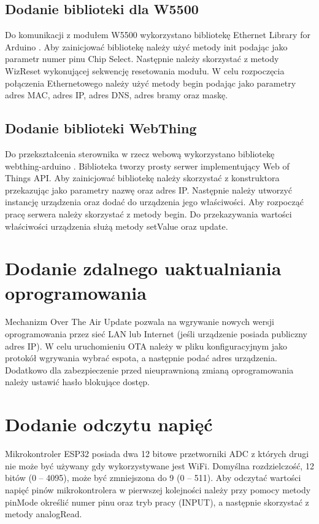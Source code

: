 \documentclass[11pt]{report}
\begin{document}
 \subsection{Dodanie biblioteki dla W5500}
 Do komunikacji z modułem W5500 wykorzystano bibliotekę Ethernet Library for Arduino \cite{ethernetlibrary}. Aby zainicjować bibliotekę należy użyć metody init podając jako parametr numer pinu Chip Select. Następnie należy skorzystać z metody WizReset wykonującej sekwencję resetowania modułu. W celu rozpoczęcia połączenia Ethernetowego należy użyć metody begin podając jako parametry adres MAC, adres IP, adres DNS, adres bramy oraz maskę.
 \subsection{Dodanie biblioteki WebThing}
 Do przekształcenia sterownika w rzecz webową wykorzystano bibliotekę webthing-arduino \cite{webthinglibrary}. Biblioteka tworzy prosty serwer implementujący Web of Things API.
 Aby zainicjować bibliotekę należy skorzystać z konstruktora przekazując jako parametry nazwę oraz adres IP. Następnie należy utworzyć instancję urządzenia oraz dodać do urządzenia jego właściwości. Aby rozpocząć pracę serwera należy skorzystać z metody begin. Do przekazywania wartości właściwości urządzenia służą metody setValue oraz update.
 
 \section{Dodanie zdalnego uaktualniania oprogramowania}
 Mechanizm Over The Air Update pozwala na wgrywanie nowych wersji oprogramowania przez sieć LAN lub Internet (jeśli urządzenie posiada publiczny adres IP). W celu uruchomieniu OTA należy w pliku konfiguracyjnym jako protokół wgrywania wybrać espota, a następnie podać adres urządzenia. Dodatkowo dla zabezpieczenie przed nieuprawnioną zmianą oprogramowania należy ustawić hasło blokujące dostęp.
 
 \section{Dodanie odczytu napięć}
 Mikrokontroler ESP32 posiada dwa 12 bitowe przetworniki ADC z których drugi nie może być używany gdy wykorzystywane jest WiFi. Domyślna rozdzielczość, 12 bitów (0 – 4095), może być zmniejszona do 9 (0 – 511).
 Aby odczytać wartości napięć pinów mikrokontrolera w pierwszej kolejności należy przy pomocy metody pinMode określić numer pinu oraz tryb pracy (INPUT), a następnie skorzystać z metody analogRead.
 
\end{document}

